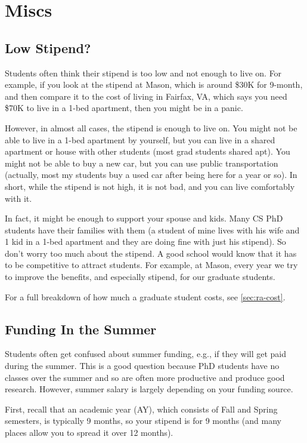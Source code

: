 \documentclass[oneside,11pt,dvipsnames]{book}
\begin{document}
\section{Miscs}


\subsection{Low Stipend?}\label{sec:low stipend}

Students often think their stipend is too low and not enough to live on.  For example, if you look at the stipend at Mason, which is around \$30K for 9-month, and then compare it to the cost of living in Fairfax, VA, which says you need \$70K to live in a 1-bed apartment, then you might be in a panic.

However,  in almost all cases, the stipend is enough to live on.  You might not be able to live in a 1-bed apartment by yourself, but you can live in a shared apartment or house with other students (most grad students shared apt).  You might not be able to buy a new car, but you can use public transportation (actually, most my students buy a used car after being here for a year or so).  In short, while the stipend is not high, it is not bad, and you can live comfortably with it.  

In fact, it might be enough to support your spouse and kids.  Many CS PhD students have their families with them (a student of mine lives with his wife and 1 kid in a 1-bed apartment and they are doing fine with just his stipend). So don't worry too much about the stipend.  A good school would know that it has to be competitive to attract students.  For example, at Mason, every year we try to improve the benefits, and especially stipend, for our graduate students.

For a full breakdown of how much a graduate student costs, see \autoref{sec:ra-cost}.


\subsection{Funding In the Summer}\label{sec:summer-funding}

Students often get confused about summer funding, e.g., if they will get paid during the summer.  This is a good question because PhD students have no classes over the summer and so are often more productive and produce good research. However, summer salary is largely depending on your funding source.

First, recall that an academic year (AY), which consists of Fall and Spring semesters, is typically 9 months, so your stipend is for 9 months (and many places allow you to spread it over 12 months).
\end{document}
